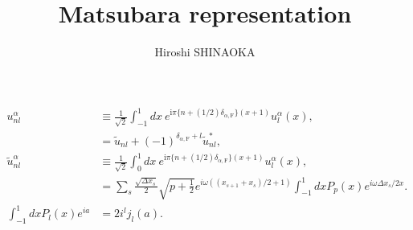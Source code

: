 \documentclass[disablejfam,12pt]{article}
\author{Hiroshi SHINAOKA}
\newcommand{\mathi}{\ensuremath{\mathrm{i}}}
\def\deltaF{\delta_{\alpha, \mathrm{F}}}
\begin{document}
\title{Matsubara representation}
\maketitle
\thispagestyle{empty}
\begin{align}
	u_{nl}^\alpha &\equiv \frac{1}{\sqrt{2}} \int_{-1}^{1} d x~e^{\mathi \pi \{n+(1/2)\deltaF\}(x+1)} u^\alpha_l(x),\label{eq:unl}\\
	&= \tilde{u}_{nl} + (-1)^{\deltaF+ l}\tilde{u}_{nl}^*, \\
	\tilde{u}_{nl}^\alpha &\equiv \frac{1}{\sqrt{2}} \int_{0}^{1} d x~e^{\mathi \pi \{n+(1/2)\deltaF\}(x+1)} u^\alpha_l(x),\\
	&= \sum_s  \frac{\sqrt{\Delta x_s}}{2} \sqrt{p+\frac{1}{2}}e^{i\omega((x_{s+1}+x_s)/2+1)} \int_{-1}^1 dxP_p(x)e^{i\omega \Delta x_s/2 x}.\\
	\int_{-1}^1 dx P_l(x)e^{ia} &= 2i^l j_l(a).
\end{align}
\end{document}
